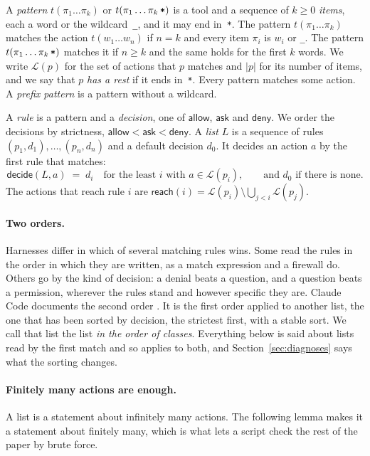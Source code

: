 \documentclass[acmsmall,nonacm,screen]{acmart}
\newcommand{\kw}[1]{\mathsf{#1}}
\newcommand{\any}{\textup{\texttt{\_}}}
\newcommand{\rest}{\textup{\texttt{*}}}
\newcommand{\lang}[1]{\mathcal{L}(#1)}
\newcommand{\reach}{\kw{reach}}
\newcommand{\dec}{\kw{decide}}
\begin{document}
A \emph{pattern} $t(\pi_1 \ldots \pi_k)$ or $t(\pi_1 \ldots \pi_k\,\rest)$ is a tool and a
sequence of $k \ge 0$ \emph{items}, each a word or the wildcard~\any, and it may end
in~\rest. The pattern $t(\pi_1 \ldots \pi_k)$ matches the action $t(w_1 \ldots w_n)$ if $n =
k$ and every item $\pi_i$ is $w_i$ or \any. The pattern $t(\pi_1 \ldots \pi_k\,\rest)$
matches it if $n \ge k$ and the same holds for the first $k$ words. We write $\lang{p}$ for
the set of actions that $p$ matches and $|p|$ for its number of items, and we say that $p$
\emph{has a rest} if it ends in~\rest. Every pattern matches some action. A \emph{prefix
pattern} is a pattern without a wildcard.

A \emph{rule} is a pattern and a \emph{decision}, one of $\kw{allow}$, $\kw{ask}$ and
$\kw{deny}$. We order the decisions by strictness, $\kw{allow} < \kw{ask} < \kw{deny}$. A
\emph{list} $L$ is a sequence of rules $(p_1, d_1), \ldots, (p_n, d_n)$ and a default
decision $d_0$. It decides an action $a$ by the first rule that matches:
\[
  \dec(L, a) \;=\; d_i \quad\text{for the least $i$ with } a \in \lang{p_i},
  \qquad\text{and } d_0 \text{ if there is none.}
\]
The actions that reach rule $i$ are $\reach(i) = \lang{p_i} \setminus \bigcup_{j < i}
\lang{p_j}$.

\paragraph{Two orders.} Harnesses differ in which of several matching rules wins. Some read
the rules in the order in which they are written, as a match expression and a firewall do.
Others go by the kind of decision: a denial beats a question, and a question beats a
permission, wherever the rules stand and however specific they are. Claude Code documents
the second order \citep{claudecodepermissions}. It is the first order applied to another
list, the one that has been sorted by decision, the strictest first, with a stable sort. We
call that list the list \emph{in the order of classes}. Everything below is said about lists
read by the first match and so applies to both, and Section~\ref{sec:diagnoses} says what the
sorting changes.

\paragraph{Finitely many actions are enough.} A list is a statement about infinitely many
actions. The following lemma makes it a statement about finitely many, which is what lets a
script check the rest of the paper by brute force.
\end{document}
